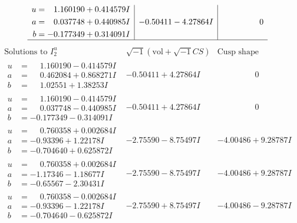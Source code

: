 \documentclass[1p]{elsarticle_modified}
\theoremstyle{definition}
\newcommand{\I}{\sqrt{-1}}
\begin{document}
$$\begin{array}{c|c|c}
\begin{aligned}
u &= \phantom{-}1.160190 + 0.414579 I \\
a &= \phantom{-}0.037748 + 0.440985 I \\
b &= -0.177349 + 0.314091 I\end{aligned}
 & -0.50411 - 4.27864 I & \phantom{-0.000000 } 0\\
 \hline 
 \end{array}$$\newpage$$\begin{array}{c|c|c}  
\text{Solutions to }I^u_{2}& \I (\text{vol} + \sqrt{-1}CS) & \text{Cusp shape}\\
 \hline 
\begin{aligned}
u &= \phantom{-}1.160190 - 0.414579 I \\
a &= \phantom{-}0.462084 + 0.868271 I \\
b &= \phantom{-}1.02551 + 1.38253 I\end{aligned}
 & -0.50411 + 4.27864 I & \phantom{-0.000000 } 0 \\ \hline\begin{aligned}
u &= \phantom{-}1.160190 - 0.414579 I \\
a &= \phantom{-}0.037748 - 0.440985 I \\
b &= -0.177349 - 0.314091 I\end{aligned}
 & -0.50411 + 4.27864 I & \phantom{-0.000000 } 0 \\ \hline\begin{aligned}
u &= \phantom{-}0.760358 + 0.002684 I \\
a &= -0.93396 + 1.22178 I \\
b &= -0.704640 + 0.625872 I\end{aligned}
 & -2.75590 - 8.75497 I & -4.00486 + 9.28787 I \\ \hline\begin{aligned}
u &= \phantom{-}0.760358 + 0.002684 I \\
a &= -1.17346 - 1.18677 I \\
b &= -0.65567 - 2.30431 I\end{aligned}
 & -2.75590 - 8.75497 I & -4.00486 + 9.28787 I \\ \hline\begin{aligned}
u &= \phantom{-}0.760358 - 0.002684 I \\
a &= -0.93396 - 1.22178 I \\
b &= -0.704640 - 0.625872 I\end{aligned}
 & -2.75590 + 8.75497 I & -4.00486 - 9.28787 I \\ \hline\begin{aligned}

\end{aligned}
\end{array}$$
\end{document}
